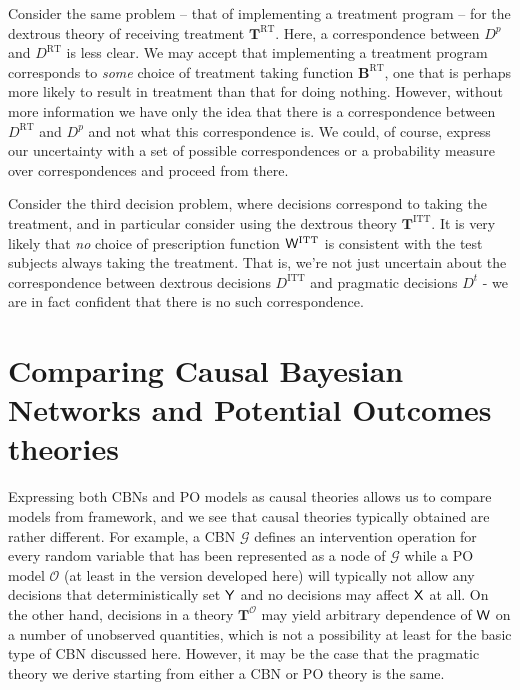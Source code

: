 Consider the same problem -- that of implementing a treatment program -- for the dextrous theory of receiving treatment $\mathbf{T}^{\mathrm{RT}}$. Here, a correspondence between $D^p$ and $D^{\mathrm{RT}}$ is less clear. We may accept that implementing a treatment program corresponds to \emph{some} choice of treatment taking function $\mathbf{B}^{\mathrm{RT}}$, one that is perhaps more likely to result in treatment than that for doing nothing. However, without more information we have only the idea that there is a correspondence between $D^{\mathrm{RT}}$ and $D^p$ and not what this correspondence is. We could, of course, express our uncertainty with a set of possible correspondences or a probability measure over correspondences and proceed from there.

Consider the third decision problem, where decisions correspond to taking the treatment, and in particular consider using the dextrous theory $\mathbf{T}^{\mathrm{ITT}}$. It is very likely that \emph{no} choice of prescription function $\mathsf{W}^{\mathrm{ITT}}$ is consistent with the test subjects always taking the treatment. That is, we're not just uncertain about the correspondence between dextrous decisions $D^{\mathrm{ITT}}$ and pragmatic decisions $D^t$ - we are in fact confident that there is no such correspondence.

\section{Comparing Causal Bayesian Networks and Potential Outcomes theories}

Expressing both CBNs and PO models as causal theories allows us to compare models from framework, and we see that causal theories typically obtained are rather different. For example, a CBN $\mathcal{G}$ defines an intervention operation for every random variable that has been represented as a node of $\mathcal{G}$ while a PO model $\mathscr{O}$ (at least in the version developed here) will typically not allow any decisions that deterministically set $\mathsf{Y}$ and no decisions may affect $\mathsf{X}$ at all. On the other hand, decisions in a theory $\mathbf{T}^{\mathscr{O}}$ may yield arbitrary dependence of $\mathsf{W}$ on a number of unobserved quantities, which is not a possibility at least for the basic type of CBN discussed here. However, it may be the case that the pragmatic theory we derive starting from either a CBN or PO theory is the same.

